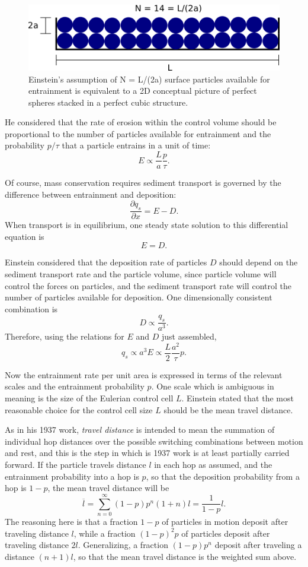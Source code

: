 \begin{figure}
  \includegraphics[width=.98\linewidth]{./figures/einsteingeometry.png}
  \caption{Einstein's assumption of N = L/(2a) surface particles available for entrainment is equivalent to a 2D conceptual picture of perfect spheres stacked in a perfect cubic structure.}
  \label{fig:surfaceParticles}
\end{figure}

He considered that the rate of erosion within the control volume should be proportional to the number of particles available for entrainment and the probability $p/\tau$ that a particle entrains in a unit of time: 
$$ E \propto \frac{L}{a}\frac{p}{\tau}. $$

Of course, mass conservation requires sediment transport is governed by the difference between entrainment and deposition: 
$$ \frac{\partial q_s}{\partial x} = E - D. $$
When transport is in equilibrium, one steady state solution to this differential equation is 
$$ E = D.$$

Einstein considered that the deposition rate of particles $D$ should depend on the sediment transport rate and the particle volume, since particle volume will control the forces on particles, and the sediment transport rate will control the number of particles available for deposition. One dimensionally consistent combination is 
$$ D \propto \frac{q_s}{a^3}.$$
Therefore, using the relations for $E$ and $D$ just assembled, 
$$ q_s \propto a^3 E \propto \frac{L}{2}\frac{a^2}{\tau} p. $$ 

Now the entrainment rate per unit area is expressed in terms of the relevant scales and the entrainment probability $p$. 
One scale which is ambiguous in meaning is the size of the Eulerian control cell $L$. Einstein stated that the most reasonable choice for the control cell size $L$ should be the mean travel distance. 

As in his 1937 work, \textit{travel distance} is intended to mean the summation of individual hop distances over the possible switching combinations between motion and rest, and this is the step in which is 1937 work is at least partially carried forward. 
If the particle travels distance $l$ in each hop as assumed, and the entrainment probability into a hop is $p$, so that the deposition probability from a hop is $1-p$, the mean travel distance will be 
$$ \overline{l} = \sum_{n=0}^{\infty} (1-p)p^n(1+n)l = \frac{1}{1-p} l.$$ 
The reasoning here is that a fraction $1-p$ of particles in motion deposit after traveling distance $l$, while a fraction $(1-p)^2p$ of particles deposit after traveling distance $2l$.
Generalizing, a fraction $(1-p)p^n$ deposit after traveling a distance $(n+1)l$, so that the mean travel distance is the weighted sum above. 

